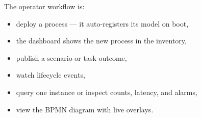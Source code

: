 The operator workflow is:
\begin{itemize}
\item deploy a process --- it auto-registers its model on boot,
\item the dashboard shows the new process in the inventory,
\item publish a scenario or task outcome,
\item watch lifecycle events,
\item query one instance or inspect counts, latency, and alarms,
\item view the BPMN diagram with live overlays.
\end{itemize}
